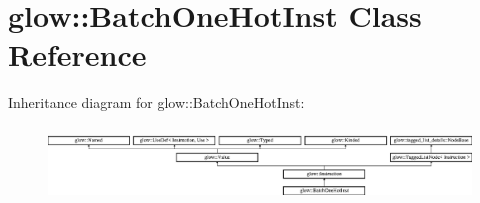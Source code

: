 \hypertarget{classglow_1_1_batch_one_hot_inst}{}\section{glow\+:\+:Batch\+One\+Hot\+Inst Class Reference}
\label{classglow_1_1_batch_one_hot_inst}
Inheritance diagram for glow\+:\+:Batch\+One\+Hot\+Inst\+:\begin{figure}[H]
\begin{center}
\leavevmode
\includegraphics[height=1.991111cm]{classglow_1_1_batch_one_hot_inst}
\end{center}
\end{figure}
